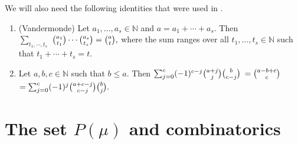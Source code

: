 \documentclass[ALCO,Unicode]{cedram}
\numberwithin{equation}{section}
\begin{document}
We will also need the following identities that were used in \cite{MS3}. 
\begin{lemma}\label{bin2} \;\begin{enumerate}
		
		\item \textup{(Vandermonde)} Let $a_1, \dots, a_s \in \mathbb{N}$ and $a=a_1+\cdots+a_s$. Then \\$\sum_{t_1,\cdots,t_s}$ $\tbinom{a_1}{ t_1}\cdots \tbinom{a_s}{t_s}=\tbinom{a}{t},$
			where the sum ranges over all $t_1,\dots,t_s \in \mathbb{N} $ such that $t_1+\cdots+t_s = t.$
		\item Let $a,b,c \in \mathbb{N}$  such that $ b \le a$. Then
		$\sum_{j=0}^{c}(-1)^{c-j}\tbinom{a+j}{j}\tbinom{b}{c-j}$ $=\tbinom{a-b+c}{c}$ $= \sum_{j=0}^{c}(-1)^{j}\tbinom{a+c-j}{c-j}\tbinom{b}{j}.$
	\end{enumerate}
\end{lemma}

\section{The set \texorpdfstring{$P(\mu)$}{P(mu)} and combinatorics}
	
\end{document}
